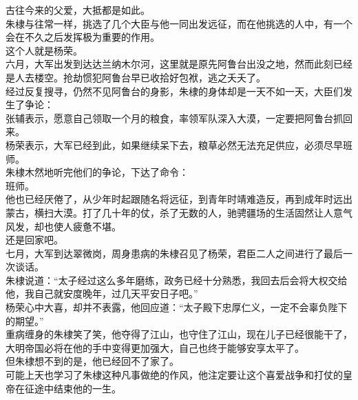 \begin{multicols}{\theparacolNo}
古往今来的父爱，大抵都是如此。\\

朱棣与往常一样，挑选了几个大臣与他一同出发远征，而在他挑选的人中，有一个会在不久之后发挥极为重要的作用。\\

这个人就是杨荣。\\

六月，大军出发到达达兰纳木尔河，这里就是原先阿鲁台出没之地，然而此刻已经是人去楼空。抢劫惯犯阿鲁台早已收拾好包袱，逃之夭夭了。\\

经过反复搜寻，仍然不见阿鲁台的身影，朱棣的身体却是一天不如一天，大臣们发生了争论：\\

张辅表示，愿意自己领取一个月的粮食，率领军队深入大漠，一定要把阿鲁台抓回来。\\

杨荣表示，大军已经到此，如果继续呆下去，粮草必然无法充足供应，必须尽早班师。\\

朱棣木然地听完他们的争论，下达了命令：\\

班师。\\

他也已经厌倦了，从少年时起跟随名将远征，到青年时靖难造反，再到成年时远出蒙古，横扫大漠。打了几十年的仗，杀了无数的人，驰骋疆场的生活固然让人意气风发，却也使人疲惫不堪。\\

还是回家吧。\\

七月，大军到达翠微岗，周身患病的朱棣召见了杨荣，君臣二人之间进行了最后一次谈话。\\

朱棣说道：“太子经过这么多年磨练，政务已经十分熟悉，我回去后会将大权交给他，我自己就安度晚年，过几天平安日子吧。”\\

杨荣心中大喜，却并不表露，他回应道：“太子殿下忠厚仁义，一定不会辜负陛下的期望。”\\

重病缠身的朱棣笑了笑，他夺得了江山，也守住了江山，现在儿子已经很能干了，大明帝国必将在他的手中变得更加强大，自己也终于能够安享太平了。\\

但朱棣想不到的是，他已经回不了家了。\\

可能上天也学习了朱棣这种凡事做绝的作风，他注定要让这个喜爱战争和打仗的皇帝在征途中结束他的一生。\\


\end{multicols}
